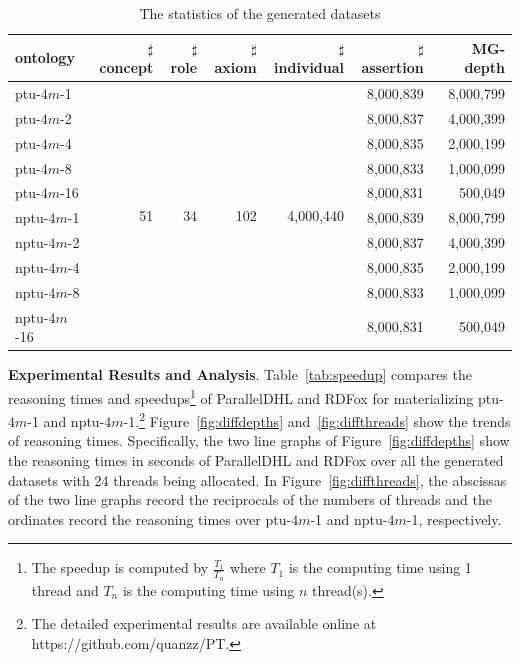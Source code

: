 \begin{table}
\centering
\caption{The statistics of the generated datasets}
\begin{tabular}{|l|r|r|r|r|r|r|}
\hline
ontology&$\sharp$concept&$\sharp$role&$\sharp$axiom&$\sharp$individual&$\sharp$assertion&MG-depth\\
\hline
ptu-$4m$-1&\multirow{10}{*}{51}&\multirow{10}{*}{34}&\multirow{10}{*}{102}&\multirow{10}{*}{4,000,440}&8,000,839&8,000,799\\
ptu-$4m$-2&&&&&8,000,837&4,000,399\\
ptu-$4m$-4&&&&&8,000,835&2,000,199\\
ptu-$4m$-8&&&&&8,000,833&1,000,099\\
ptu-$4m$-16&&&&&8,000,831&500,049\\
nptu-$4m$-1&&&&&8,000,839&8,000,799\\
nptu-$4m$-2&&&&&8,000,837&4,000,399\\
nptu-$4m$-4&&&&&8,000,835&2,000,199\\
nptu-$4m$-8&&&&&8,000,833&1,000,099\\
nptu-$4m$-16&&&&&8,000,831&500,049\\
\hline
\end{tabular}
\label{tab:generated}
\end{table}

\textbf{Experimental Results and Analysis}.
Table~\ref{tab:speedup} compares the reasoning times and
speedups\footnote{The speedup is computed by $\frac{T_1}{T_n}$ where $T_1$ is the computing time
using 1 thread and $T_n$ is the computing time using $n$ thread(s).}
of ParallelDHL and RDFox for materializing ptu-$4m$-1 and
nptu-$4m$-1.\footnote{The detailed experimental results are available
  online at https://github.com/quanzz/PT.} 
Figure~\ref{fig:diffdepths} and~\ref{fig:diffthreads} show the trends of
reasoning times. Specifically, the two line graphs of Figure~\ref{fig:diffdepths}
show the reasoning times in seconds of ParallelDHL and RDFox over
all the generated datasets with 24 threads being allocated. In Figure~\ref{fig:diffthreads},
the abscissas of the two line graphs record the reciprocals of the numbers of threads and
the ordinates record the reasoning times over ptu-$4m$-1 and nptu-$4m$-1, respectively.

